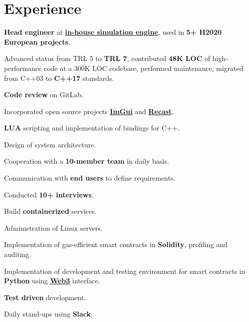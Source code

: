 \documentclass[]{deedy-resume-openfont}
\begin{document}
\begin{minipage}[t]{0.66\textwidth}


\section{Experience}
\vspace{\topsep} %
\begin{tightemize}
\item \textbf{Head engineer} at \textbf{\href{https://ui.adsabs.harvard.edu/abs/2016SPIE.9842E..0QK/abstract}{in-house simulation engine}}, used in \textbf{5+ H2020 European projects}.
\item Advanced status from TRL 5 to \textbf{TRL 7}, contributed \textbf{48K LOC} of
    high-performance code at a 300K LOC codebase, performed maintenance,
    migrated from
C++03 to \textbf{C++17} standards.
\item \textbf{Code review} on GitLab.
\item Incorporated open source projects \textbf{\href{https://github.com/ocornut/imgui}{ImGui}} and \textbf{\href{https://github.com/recastnavigation/recastnavigation}{Recast}}.
\item \textbf{LUA} scripting and implementation of bindings for C++.
\item Design of system architecture.
\item Cooperation with a \textbf{10-member team} in daily basis.
\item Communication with \textbf{end users} to define requirements.
\item Conducted \textbf{10+ interviews}.
\item Build \textbf{containerized} services.
\item Administration of Linux servers.
\end {tightemize}
\sectionsep

\begin{tightemize}
\item Implementation of gas-efficient smart contracts in \textbf{Solidity},
    profiling and auditing.
\item Implementation of development and testing environment for smart contracts
    in \textbf{Python} using
    \textbf{\href{https://web3py.readthedocs.io/en/stable/}{Web3}} interface.
\item \textbf{Test driven} development.
\item Daily stand-ups using \textbf{Slack}.
\end {tightemize}
\sectionsep


\end{minipage}
\end{document}
